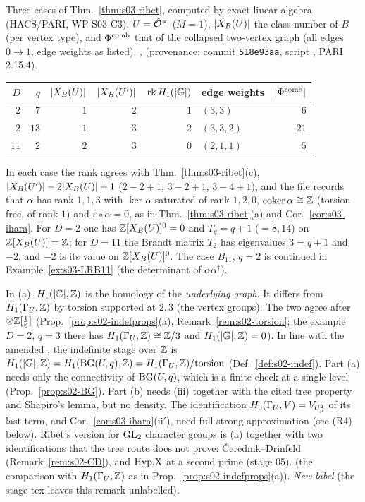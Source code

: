 \begin{example}\label{ex:s03-T2}
Three cases of Thm.~\ref{thm:s03-ribet}, computed by exact linear algebra (HACS/PARI, WP S03-C3), $U=\hat{\mathcal{O}}^\times$ ($M=1$), $|X_B(U)|$ the class number of $B$ (per vertex type), and
$\Phi^{\mathrm{comb}}$ that of the collapsed two-vertex graph (all edges $0\to1$, edge weights as listed). \stcomp{}, 
(provenance: commit \texttt{518e93aa}, script , PARI 2.15.4).
\begin{center}\small
\begin{tabular}{rrrrrlr}\toprule
$D$ & $q$ & $|X_B(U)|$ & $|X_B(U')|$ & $\operatorname{rk} H_1(|\mathbb{G}|)$ & edge weights & $|\Phi^{\mathrm{comb}}|$\\\midrule
$2$ & $7$ & $1$ & $2$ & $1$ & $(3,3)$ & $6$\\
$2$ & $13$ & $1$ & $3$ & $2$ & $(3,3,2)$ & $21$\\
$11$ & $2$ & $2$ & $3$ & $0$ & $(2,1,1)$ & $5$\\\bottomrule
\end{tabular}
\end{center}
In each case the rank agrees with Thm.~\ref{thm:s03-ribet}(c), $|X_B(U')|-2|X_B(U)|+1$ ($2-2+1$, $3-2+1$, $3-4+1$), and the file records that $\alpha$ has rank
$1,1,3$ with $\ker\alpha$ saturated of rank $1,2,0$, $\operatorname{coker}\alpha\cong\mathbb{Z}$ (torsion free, of rank $1$) and $\varepsilon\circ\alpha=0$, as in Thm.~\ref{thm:s03-ribet}(a)
and Cor.~\ref{cor:s03-ihara}. For $D=2$ one has $\mathbb{Z}[X_B(U)]^0=0$ and $T_q=q+1$ ($=8,14$) on $\mathbb{Z}[X_B(U)]=\mathbb{Z}$; for $D=11$ the Brandt matrix $T_2$ has eigenvalues $3=q+1$ and $-2$, and $-2$ is its value on $\mathbb{Z}[X_B(U)]^0$. The case $B_{11}$, $q=2$ is continued in Example~\ref{ex:s03-LRB11} (the determinant of $\alpha\alpha^\dagger$).
\end{example}

\begin{remark}\label{rem:s03-torsion}
In (a), $H_1(|\mathbb{G}|,\mathbb{Z})$ is the homology of the \emph{underlying graph}. It differs from $H_1(\Gamma_U,\mathbb{Z})$ by torsion supported at $2,3$
(the vertex groups). The two agree after $\otimes\mathbb{Z}[\frac16]$ (Prop.~\ref{prop:s02-indefprops}(a), Remark~\ref{rem:s02-torsion}; the example
$D=2$, $q=3$ there has $H_1(\Gamma_U,\mathbb{Z})\cong\mathbb{Z}/3$ and $H_1(|\mathbb{G}|,\mathbb{Z})=0$). In line with the amended , the
indefinite stage over $\mathbb{Z}$ is $H_1(|\mathbb{G}|,\mathbb{Z})=H_1(\mathrm{BG}(U,q),\mathbb{Z})=H_1(\Gamma_U,\mathbb{Z})/\mathrm{torsion}$ (Def.~\ref{def:s02-indef}). Part (a) needs only the
connectivity of $\mathrm{BG}(U,q)$, which is a finite check at a single level (Prop.~\ref{prop:s02-BG}). Part (b) needs (iii) together with the cited tree property and
Shapiro's lemma, but no density. The identification $H_0(\Gamma_U,V)=V_{U^1_p}$ of its last term, and Cor.~\ref{cor:s03-ihara}(ii$'$), need full strong
approximation (see (R4) below).
Ribet's version for $\mathrm{GL}_2$ character groups is (a) together with two identifications that the tree
route does not prove: \v{C}erednik--Drinfeld (Remark~\ref{rem:s02-CD}), and $\mathrm{Hyp.X}$ at a second prime (stage 05). \stproved{} (the comparison
with $H_1(\Gamma_U,\mathbb{Z})$ \stpmc{} as in Prop.~\ref{prop:s02-indefprops}(a)). \emph{New label} (the stage tex leaves this remark unlabelled).
\end{remark}

